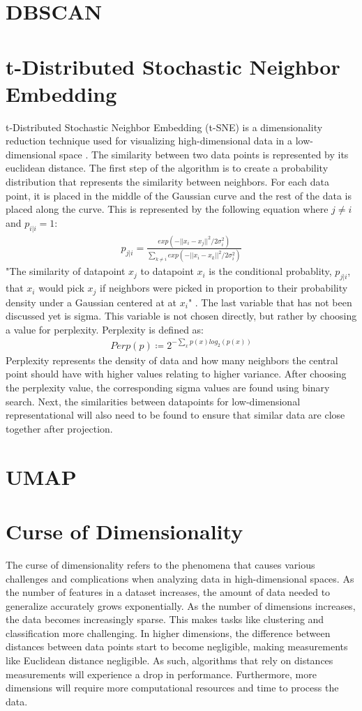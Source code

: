\section{DBSCAN}
\section{t-Distributed Stochastic Neighbor Embedding}
t-Distributed Stochastic Neighbor Embedding (t-SNE) is a dimensionality reduction technique used for visualizing high-dimensional data in a low-dimensional space \cite{vanDerMaaten2008}. The similarity between two data points is represented by its euclidean distance. The first step of the algorithm is to create a probability distribution that represents the similarity between neighbors. For each data point, it is placed in the middle of the Gaussian curve and the rest of the data is placed along the curve. This is represented by the following equation where $j \neq i$ and $p_{i|i} = 1$:
\begin{align}
p_{j|i} = \frac{exp(-||x_i - x_j||^2 / 2\sigma_i^2)}{\sum_{k \neq i}exp(-||x_i - x_k||^2 / 2\sigma_i^2)}
\end{align}
"The similarity of datapoint $x_j$ to datapoint $x_i$ is the conditional probablity, $p_{j|i}$, that $x_i$ would pick $x_j$ if neighbors were picked in proportion to their probability density under a Gaussian centered at at $x_i$" \cite{vanDerMaaten2008}. The last variable that has not been discussed yet is sigma. This variable is not chosen directly, but rather by choosing a value for perplexity. Perplexity is defined as:
\begin{align}
Perp(p) \coloneq 2^{-\sum_x p(x)log_2(p(x))}
\end{align}
Perplexity represents the density of data and how many neighbors the central point should have with higher values relating to higher variance. After choosing the perplexity value, the corresponding sigma values are found using binary search. 
Next, the similarities between datapoints for low-dimensional representational will also need to be found to ensure that similar data are close together after projection. 
\section{UMAP}
\section{Curse of Dimensionality}
The curse of dimensionality refers to the phenomena that causes various challenges and complications when analyzing data in high-dimensional spaces. As the number of features in a dataset increases, the amount of data needed to generalize accurately grows exponentially. As the number of dimensions increases, the data becomes increasingly sparse. This makes tasks like clustering and classification more challenging. In higher dimensions, the difference between distances between data points start to become negligible, making measurements like Euclidean distance negligible. As such, algorithms that rely on distances measurements will experience a drop in performance. Furthermore, more dimensions will require more computational resources and time to process the data. 
